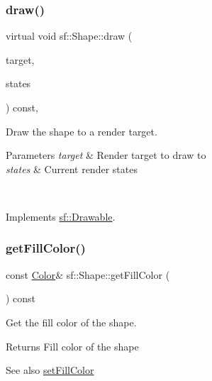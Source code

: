 \subsubsection{\texorpdfstring{draw()}{draw()}}
{\footnotesize\ttfamily virtual void sf\+::\+Shape\+::draw (\begin{DoxyParamCaption}\item[{\mbox{\hyperlink{classsf_1_1_render_target}{Render\+Target}} \&}]{target,  }\item[{\mbox{\hyperlink{classsf_1_1_render_states}{Render\+States}}}]{states }\end{DoxyParamCaption}) const\hspace{0.3cm}{\ttfamily [private]}, {\ttfamily [virtual]}}



Draw the shape to a render target. 


\begin{DoxyParams}{Parameters}
{\em target} & Render target to draw to \\
\hline
{\em states} & Current render states \begin{DoxyVerb}\end{DoxyVerb}
 \\
\hline
\end{DoxyParams}


Implements \mbox{\hyperlink{classsf_1_1_drawable_a90d2c88bba9b035a0844eccb380ef631}{sf\+::\+Drawable}}.

\mbox{\label{classsf_1_1_shape_ae3030128824e687f259d18addcf33528}} 
\subsubsection{\texorpdfstring{getFillColor()}{getFillColor()}}
{\footnotesize\ttfamily const \mbox{\hyperlink{classsf_1_1_color}{Color}}\& sf\+::\+Shape\+::get\+Fill\+Color (\begin{DoxyParamCaption}{ }\end{DoxyParamCaption}) const}



Get the fill color of the shape. 

\begin{DoxyReturn}{Returns}
Fill color of the shape
\end{DoxyReturn}
\begin{DoxySeeAlso}{See also}
\mbox{\hyperlink{classsf_1_1_shape_a3506f9b5d916fec14d583d16f23c2485}{set\+Fill\+Color}} \begin{DoxyVerb}\end{DoxyVerb}
 
\end{DoxySeeAlso}
\mbox{\label{classsf_1_1_shape_ac0e29425d908d5442060cc44790fe4da}} 
